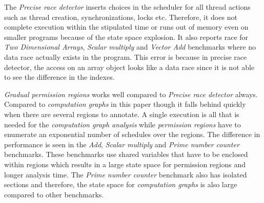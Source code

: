 The \textit{Precise race detector} inserts choices in the scheduler for all thread actions such as thread creation, synchronizations, locks etc. Therefore, it does not complete execution within the stipulated time or runs out of memory even on smaller programs because of the state space explosion. It also reports race for \textit{Two Dimensional Arrays}, \textit{Scalar multiply} and \textit{Vector Add} benchmarks where no data race actually exists in the program. This error is because in precise race detector, the access on an array object looks like a data race since it is not able to see the difference in the indexes.


\textit{Gradual permission regions} works well compared to \textit{Precise race detector} always. Compared to \textit{computation graphs} in this paper though it falls behind quickly when there are several regions to annotate. A single execution is all that is needed for the \textit{computation graph analysis} while \textit{permission regions} have to enumerate an exponential number of schedules over the regions. The difference in performance is seen in the \textit{Add}, \textit{Scalar multiply} and \textit{Prime number counter} benchmarks. These benchmarks use shared variables that have to be enclosed within regions which results in a large state space for permission regions and longer analysis time. The \textit{Prime number counter} benchmark also has isolated sections and therefore, the state space for \textit{computation graphs} is also large compared to other benchmarks.

